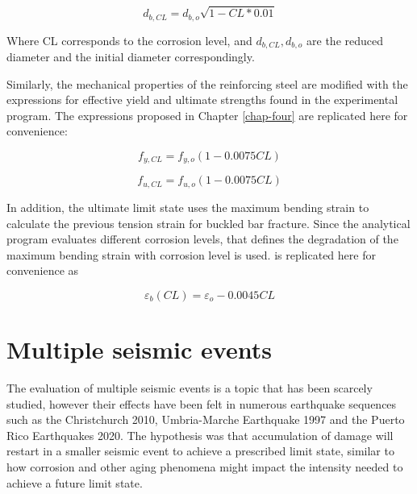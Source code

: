 \begin{equation}
    d_{b,CL} = d_{b,o} \sqrt{1 - CL*0.01}
    \label{eq:d_eff}
\end{equation}

Where CL corresponds to the corrosion level, and $d_{b,CL}, d_{b,o}$ are the reduced diameter and the initial diameter correspondingly. 

Similarly, the mechanical properties of the reinforcing steel are modified with the expressions for effective yield and ultimate strengths found in the experimental program. The expressions proposed in Chapter \ref{chap-four} are replicated here for convenience:

\begin{equation}
    f_{y,CL} = f_{y,o}(1-0.0075CL)
    \label{eq.Calderon_Fy_vs_CL_5}
\end{equation}

\begin{equation}
    f_{u,CL} = f_{u,o}(1-0.0075CL)
    \label{eq.Calderon_Fu_vs_CL_5}
\end{equation}

In addition, the ultimate limit state uses the maximum bending strain to calculate the previous tension strain for buckled bar fracture. Since the analytical program evaluates different corrosion levels,  that defines the degradation of the maximum bending strain with corrosion level is used.  is replicated here for convenience as 

\begin{equation}
    \varepsilon_{b}(CL) = \varepsilon_{o}-0.0045CL
    \label{eq.Calderon_eb_vs_CL_02}
\end{equation}

\section{Multiple seismic events}

The evaluation of multiple seismic events is a topic that has been scarcely studied, however their effects have been felt in numerous earthquake sequences such as the Christchurch 2010, Umbria-Marche Earthquake 1997 and the Puerto Rico Earthquakes 2020. The hypothesis was that accumulation of damage will restart in a smaller seismic event to achieve a prescribed limit state, similar to how corrosion and other aging phenomena might impact the intensity needed to achieve a future limit state. 

